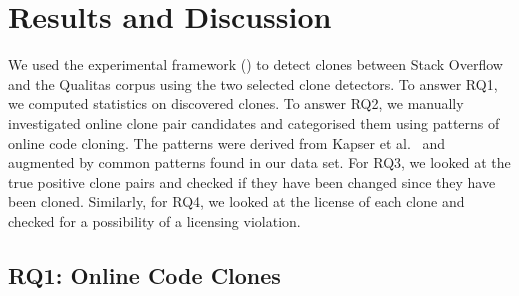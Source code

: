 \documentclass[sigconf,review, anonymous]{acmart}
\begin{document}

\section{Results and Discussion}

We used the experimental framework () to
detect clones between Stack Overflow and the Qualitas corpus using the
two selected clone detectors. To answer RQ1, we computed statistics on
discovered clones. To answer RQ2, we manually investigated online
clone pair candidates and categorised them using patterns of online
code cloning. The patterns were derived from Kapser et
al.~\cite{Kapser2003} and augmented by common patterns found in our
data set. For RQ3, we looked at the true positive clone pairs and
checked if they have been changed since they have been
cloned. Similarly, for RQ4, we looked at the license of each
clone and checked for a possibility of a licensing violation.

\subsection{RQ1: Online Code Clones} 
\end{document}
